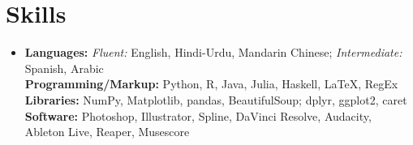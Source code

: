 \documentclass[letterpaper,10pt]{article}
\makeatletter
\newcommand{\resumeSubheading}[4]{
    \item\vspace{-2pt}
    \begin{tabular*}{0.97\textwidth}[t]{l@{\extracolsep{\fill}}r}
      \textbf{#1} & #2 \\
      #3 & #4 \\
    \end{tabular*}%
}
\newcommand{\resumeSubHeadingListEnd}{\end{itemize}}
\makeatother
\begin{document}




\section{Skills}
\begin{itemize}[leftmargin=0.15in, label={}]
    \small\item{
    \textbf{Languages:} \emph{Fluent:} English, Hindi-Urdu, Mandarin Chinese; \emph{Intermediate:} Spanish, Arabic \\
    \textbf{Programming/Markup:} Python, R, Java, Julia, Haskell, \LaTeX, RegEx \\
    \textbf{Libraries:} NumPy, Matplotlib, pandas, BeautifulSoup; dplyr, ggplot2, caret \\
    \textbf{Software:} Photoshop, Illustrator, Spline, DaVinci Resolve, Audacity, Ableton Live, Reaper, Musescore
    }
\end{itemize}


\end{document}
